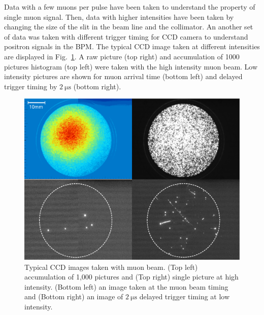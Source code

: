 \documentclass[preprint,3p,twocolumn]{elsarticle}
\begin{document}
Data with a few muons per pulse have been taken to understand the property of single muon signal.
Then, data with higher intensities have been taken by changing the size of the slit in the beam line and the collimator. 
An another set of data was taken with different trigger timing for CCD camera to understand positron signals in the BPM. %
The typical CCD image taken at different intensities are displayed in Fig.~\ref{fig:single_cluster}.  A raw picture (top right) and accumulation of 1000 pictures histogram (top left) were taken with the high intensity muon beam. Low intensity pictures are shown for muon arrival time (bottom left) and delayed trigger timing by $\SI{2}{\micro\s}$ (bottom right).
\begin{figure}[tbp]
	\centering
	\includegraphics[width=\columnwidth]{figure/fig3_v2.pdf}
	\caption{Typical CCD images taken with muon beam. (Top left) accumulation of 1,000 pictures and (Top right) single picture at high intensity.  (Bottom left) an image taken at the muon beam timing and (Bottom right) an image of $\SI{2}{\micro\s}$ delayed trigger timing at low intensity.
	}
	\vspace{-0.4cm}
	\label{fig:single_cluster}
\end{figure}
\end{document}
